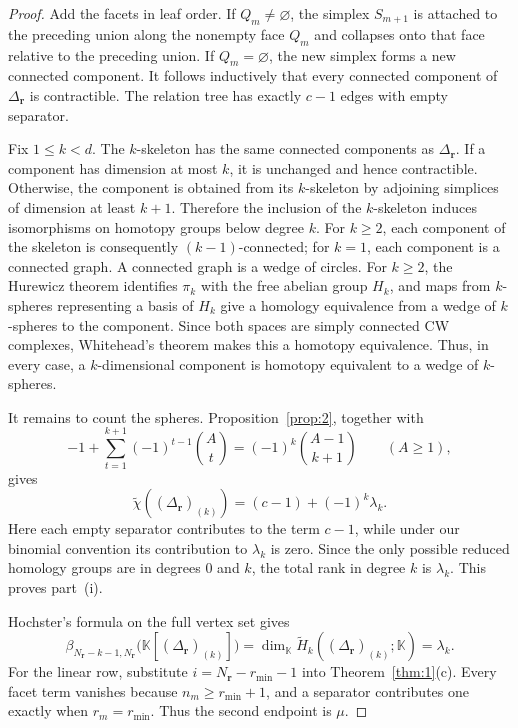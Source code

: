 \documentclass[11pt]{amsart}
\theoremstyle{definition}
\theoremstyle{remark}
\newcommand{\K}{\mathbb K}
\newcommand{\SR}[1]{\K[#1]}
\begin{document}
	\begin{proof}
		Add the facets in leaf order. If $Q_m\ne\varnothing$, the simplex $S_{m+1}$ is attached to the preceding union along the nonempty face $Q_m$ and collapses onto that face relative to the preceding union. If $Q_m=\varnothing$, the new simplex forms a new connected component. It follows inductively that every connected component of $\Delta_{\mathbf r}$ is contractible. The relation tree has exactly $c-1$ edges with empty separator.
		
		Fix $1\le k<d$. The $k$-skeleton has the same connected components as $\Delta_{\mathbf r}$. If a component has dimension at most $k$, it is unchanged and hence contractible. Otherwise, the component is obtained from its $k$-skeleton by adjoining simplices of dimension at least $k+1$. Therefore the inclusion of the $k$-skeleton induces isomorphisms on homotopy groups below degree $k$. For $k\ge2$, each component of the skeleton is consequently $(k-1)$-connected; for $k=1$, each component is a connected graph. A connected graph is a wedge of circles. For $k\ge2$, the Hurewicz theorem identifies $\pi_k$ with the free abelian group $H_k$, and maps from $k$-spheres representing a basis of $H_k$ give a homology equivalence from a wedge of $k$-spheres to the component. Since both spaces are simply connected CW complexes, Whitehead's theorem makes this a homotopy equivalence. Thus, in every case, a $k$-dimensional component is homotopy equivalent to a wedge of $k$-spheres.
		
		It remains to count the spheres. Proposition~\ref{prop:2}, together with
		\[
		-1+\sum_{t=1}^{k+1}(-1)^{t-1}\binom At
		=(-1)^k\binom{A-1}{k+1}
		\qquad(A\ge1),
		\]
		gives
		\[
		\widetilde\chi((\Delta_{\mathbf r})_{(k)})
		=(c-1)+(-1)^k\lambda_k.
		\]
		Here each empty separator contributes to the term $c-1$, while under our binomial convention its contribution to $\lambda_k$ is zero. Since the only possible reduced homology groups are in degrees $0$ and $k$, the total rank in degree $k$ is $\lambda_k$. This proves part~(i).
		
		Hochster's formula on the full vertex set gives
		\[
		\beta_{N_{\mathbf r}-k-1,N_{\mathbf r}}
		\bigl(\SR{(\Delta_{\mathbf r})_{(k)}}\bigr)
		=\dim_{\K}\widetilde H_k((\Delta_{\mathbf r})_{(k)};\K)
		=\lambda_k.
		\]
		For the linear row, substitute $i=N_{\mathbf r}-r_{\min}-1$ into Theorem~\ref{thm:1}(c). Every facet term vanishes because $n_m\ge r_{\min}+1$, and a separator contributes one exactly when $r_m=r_{\min}$. Thus the second endpoint is $\mu$.
		

\end{proof}
\end{document}
